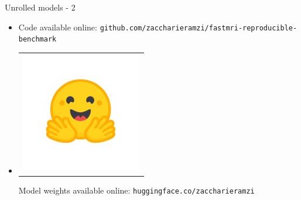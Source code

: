 \begin{frame}{Unrolled models - 2}
\begin{overprint}
        \begin{itemize}
            \item {} Code available online: \texttt{github.com/zaccharieramzi/fastmri-reproducible-benchmark}
            \item\begin{tabular}{@{}c@{}}\includegraphics[width=3ex]{Figures/hf_logo.jpeg}\end{tabular}Model weights available online: \texttt{huggingface.co/zaccharieramzi}
        \end{itemize}
    
\end{overprint}
    


\end{frame}

